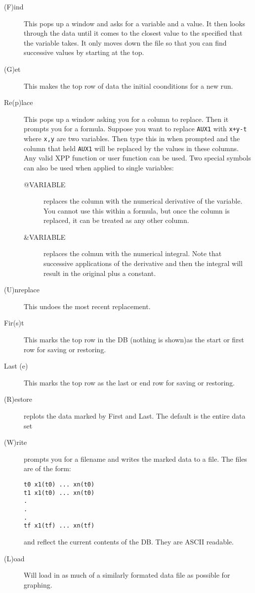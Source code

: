 \begin{description}  
\item[(F)ind] This pops up a window and asks for a variable and a
value.  It then looks through the data until it comes to the closest
value to the specified that the variable takes.  It only moves down
the file so that you can find successive values by starting at the
top.
\item[(G)et] This makes the top row of data the initial coonditions
for a new run.
\item[Re(p)lace] This pops up a window asking you for a column to
replace.  Then it prompts you for a formula.  Suppose you want to
replace {\tt AUX1} with {\tt x+y-t} where {\tt x,y} are two variables.
Then type this in when prompted and the column that held {\tt AUX1}
will be replaced by the values in these columns. Any valid XPP
function or user function can be used.  Two special symbols can also
be used when applied to single variables:
\begin{description}
\item[@VARIABLE] replaces the column with the numerical derivative of
the variable.  You cannot use this within a formula, but once the
column is replaced, it can be treated as any other column.
\item[\&VARIABLE] replaces the colmun with the numerical integral.
Note that successive applications of the derivative and then the
integral will result in the original plus a constant.
\end{description}
\item[(U)nreplace] This undoes the most recent replacement.
\item[Fir(s)t] This marks the top row in the DB (nothing is shown)as
the start or first row for saving or restoring.
\item[Last (e)] This marks the top row as the last or end row for
saving or restoring.
\item[(R)estore] replots the data marked by First and Last.  The
default is the entire data set
\item[(W)rite] prompts you for a filename and writes the marked data
to a file.  The files are of the form:
\begin{verbatim}
t0 x1(t0) ... xn(t0)
t1 x1(t0) ... xn(t0)
.
.
.
tf x1(tf) ... xn(tf)
\end{verbatim}
and reflect the current contents of the DB.  They are ASCII readable.
\item[(L)oad] Will load in as much of a similarly formated data file
as possible for graphing.
\end{description}

